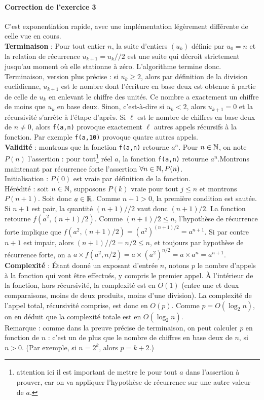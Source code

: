 \documentclass[11pt,a4paper]{article}
\begin{document}
\paragraph{Correction de l'exercice 3 }\par
C'est exponentiation rapide, avec une implémentation légèrement différente de celle vue en cours.\\
\textbf{Terminaison} : Pour tout entier $n$, la suite d'entiers $(u_k)$ définie par $u_0=n$ et la relation de récurrence $u_{k+1} = u_k // 2$ est une suite qui décroit strictement jusqu'au moment où elle stationne à zéro. L'algorithme termine donc.\\
Terminaison, version plus précise : si $u_k\geq 2$, alors par définition de la division euclidienne, $u_{k+1}$ est le nombre dont l'écriture en base deux est obtenue à partie de celle de $u_k$ en enlevant le chiffre des unités. Ce nombre a exactement un chiffre de moins que $u_k$ en base deux. Sinon, c'est-à-dire si $u_k<2$, alors $u_{k+1}=0$ et la récursivité s'arrête à l'étape d'après. Si $\ell$ est le nombre de chiffres en base deux de $n\neq 0$, alors \verb+f(a,n)+ provoque exactement $\ell$ autres appels récursifs à la fonction. Par exemple \verb+f(a,10)+ provoque quatre autres appels.\\
\textbf{Validité} : montrons que la fonction \verb+f(a,n)+ retourne $a^n$. Pour $n\in\mathbb{N}$, on note $P(n)$ l'assertion : \og pour tout\footnote{attention ici il est important de mettre le pour tout $a$ dans l'assertion à prouver, car on va appliquer l'hypothèse de récurrence sur une autre valeur de $a$.} réel $a$, la fonction \verb+f(a,n)+ retourne $a^n$.\fg Montrons maintenant par récurrence forte l'assertion $\forall n\in\mathbb{N}, P(n)$.\\
Initialisation : $P(0)$ est vraie par définition de la fonction.\\
Hérédité : soit $n\in \mathbb{N}$, supposons $P(k)$ vraie pour tout $j\leq n$ et montrons $P(n+1)$. Soit donc $a\in \mathbb{R}$. Comme $n+1>0$, la première condition est sautée. Si $n+1$ est pair, la quantité $(n+1)//2$ vaut donc $(n+1)/2$. La fonction retourne $f(a^2,(n+1)/2)$. Comme $(n+1)/2\leq n$, l'hypothèse de récurrence forte implique que $f(a^2,(n+1)/2) = (a^2)^{(n+1)/2} = a^{n+1}$.
Si par contre $n+1$ est impair, alors $(n+1)//2 =n/2\leq n$, et toujours par hypothèse de récurrence forte, on a $a\times f(a^2,n/2) = a\times(a^2)^{n/2} = a\times a^n=a^{n+1}$.\\
\textbf{Complexité} : Étant donné un exposant d'entrée $n$, notons $p$ le nombre d'appels à la fonction qui vont être effectués, y compris le premier appel.
À l'intérieur de la fonction, hors récursivité, la complexité est en $O(1)$ (entre une et deux comparaisons, moins de deux produits, moins d'une division).
La complexité de l'appel total, récursivité comprise, est donc en $O(p)$. Comme $p  = O(\log_2 n)$, on en déduit que la complexité totale est en $O(\log_2 n)$.\\
Remarque : comme dans la preuve précise de terminaison, on peut calculer $p$ en fonction de $n$ : c'est un de plus que le nombre de chiffres en base deux de $n$, si $n>0$. (Par exemple, si $n=2^k$, alors $p=k+2$.) 
\end{document}
